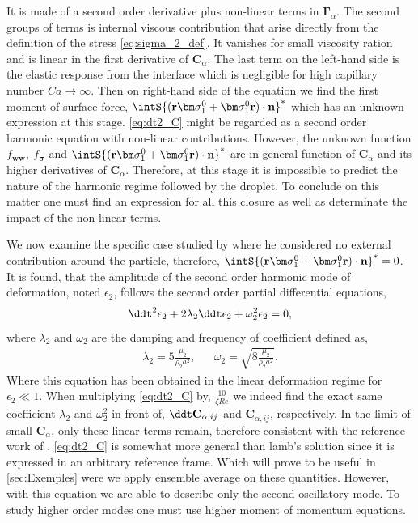 It is made of a second order derivative plus non-linear terms in $\bm\Gamma_\alpha$. 
The second groups of terms is internal viscous contribution that arise directly from the definition of the stress \ref{eq:sigma_2_def}. 
It vanishes for small viscosity ration and is linear in the first derivative of $\textbf{C}_\alpha$. 
The last term on the left-hand side is the elastic response from the interface which is negligible for high capillary number $Ca \to \infty$. 
Then on right-hand side of the equation we find the first moment of surface force, $\intS{(\textbf{r}\bm\sigma_1^0+ \bm\sigma_1^0\textbf{r})\cdot \textbf{n}}^*$ which has an unknown expression at this stage. 
\ref{eq:dt2_C} might be regarded as a second order harmonic equation with non-linear contributions. 
However, the unknown function $f_\textbf{ww},\ f_{\bm{\sigma}}$ and $\intS{(\textbf{r}\bm\sigma_1^0+ \bm\sigma_1^0\textbf{r})\cdot \textbf{n}}^*$ are in general function of $\textbf{C}_\alpha$ and its higher derivatives of $\textbf{C}_\alpha$.   
Therefore, at this stage it is impossible to predict the nature of the harmonic regime followed by the droplet. 
To conclude on this matter one must find an expression for all this closure as well as determinate the impact of the non-linear terms.

We now examine the specific case studied by \citet{lamb1924hydrodynamics} where he considered no external contribution around the particle, therefore, $\intS{(\textbf{r}\bm\sigma_1^0+ \bm\sigma_1^0\textbf{r})\cdot \textbf{n}}^* = 0$.
It is found, that the amplitude of the second order harmonic mode of deformation, noted $\epsilon_2$, follows the second order partial differential equations,  
\begin{equation*}
    \ddt^2{\epsilon_2}
    + 2\lambda_2 \ddt \epsilon_2
    + \omega_2^2 \epsilon_2
     = 0,
\end{equation*}
where $\lambda_2$ and $\omega_2$ are the damping and frequency of coefficient defined as, 
\begin{align*}
    \lambda_2 = 5 \frac{\mu_2}{\rho_2a^2},
    && \omega_2 = \sqrt{8 \frac{\mu_2}{\rho_2 a^2}}.
\end{align*}
Where this equation has been obtained in the linear deformation regime for $\epsilon_2 \ll 1$. 
When multiplying \ref{eq:dt2_C} by, $\frac{10}{\zeta Re}$ we indeed find the exact same coefficient $\lambda_2$ and $\omega_2^2$ in front of, $\ddt \textbf{C}_{\alpha,ij}$ and $\textbf{C}_{\alpha,ij}$, respectively. 
In the limit of small $\textbf{C}_\alpha$, only these linear terms remain, therefore consistent with the reference work of \citet{lamb1924hydrodynamics}. 
\ref{eq:dt2_C} is somewhat more general than lamb's solution since it is expressed in an arbitrary reference frame. 
Which will prove to be useful in \ref{sec:Exemples} were we apply ensemble average on these quantities. 
However, with this equation we are able to describe only the second oscillatory mode. 
To study higher order modes one must use higher moment of momentum equations. 

